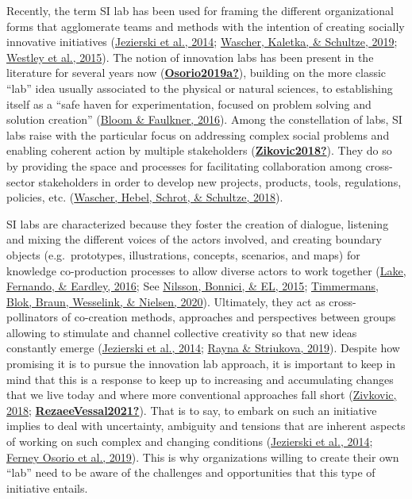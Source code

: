 \documentclass[]{elsarticle} %
\begin{document}
Recently, the term SI lab has been used for framing the different
organizational forms that agglomerate teams and methods with the
intention of creating socially innovative initiatives
(\protect\hyperlink{ref-Jezierski2014}{Jezierski et al., 2014};
\protect\hyperlink{ref-Wascher2019}{Wascher, Kaletka, \& Schultze,
2019}; \protect\hyperlink{ref-Westley2015}{Westley et al., 2015}). The
notion of innovation labs has been present in the literature for several
years now (\protect\hyperlink{ref-Osorio2019a}{\textbf{Osorio2019a?}}),
building on the more classic ``lab'' idea usually associated to the
physical or natural sciences, to establishing itself as a ``safe haven
for experimentation, focused on problem solving and solution creation''
(\protect\hyperlink{ref-Bloom2016}{Bloom \& Faulkner, 2016}). Among the
constellation of labs, SI labs raise with the particular focus on
addressing complex social problems and enabling coherent action by
multiple stakeholders
(\protect\hyperlink{ref-Zikovic2018}{\textbf{Zikovic2018?}}). They do so
by providing the space and processes for facilitating collaboration
among cross-sector stakeholders in order to develop new projects,
products, tools, regulations, policies, etc.
(\protect\hyperlink{ref-Wascher2018}{Wascher, Hebel, Schrot, \&
Schultze, 2018}).

SI labs are characterized because they foster the creation of dialogue,
listening and mixing the different voices of the actors involved, and
creating boundary objects (e.g.~prototypes, illustrations, concepts,
scenarios, and maps) for knowledge co-production processes to allow
diverse actors to work together (\protect\hyperlink{ref-Lake2016}{Lake,
Fernando, \& Eardley, 2016}; See
\protect\hyperlink{ref-Nilsson2015}{Nilsson, Bonnici, \& EL, 2015};
\protect\hyperlink{ref-Timmermans2020}{Timmermans, Blok, Braun,
Wesselink, \& Nielsen, 2020}). Ultimately, they act as cross-pollinators
of co-creation methods, approaches and perspectives between groups
allowing to stimulate and channel collective creativity so that new
ideas constantly emerge (\protect\hyperlink{ref-Jezierski2014}{Jezierski
et al., 2014}; \protect\hyperlink{ref-Rayna2019}{Rayna \& Striukova,
2019}). Despite how promising it is to pursue the innovation lab
approach, it is important to keep in mind that this is a response to
keep up to increasing and accumulating changes that we live today and
where more conventional approaches fall short
(\protect\hyperlink{ref-Zivkovic2018}{Zivkovic, 2018};
\protect\hyperlink{ref-RezaeeVessal2021}{\textbf{RezaeeVessal2021?}}).
That is to say, to embark on such an initiative implies to deal with
uncertainty, ambiguity and tensions that are inherent aspects of working
on such complex and changing conditions
(\protect\hyperlink{ref-Jezierski2014}{Jezierski et al., 2014};
\protect\hyperlink{ref-Osorio2019}{Ferney Osorio et al., 2019}). This is
why organizations willing to create their own ``lab'' need to be aware
of the challenges and opportunities that this type of initiative
entails.
\end{document}
